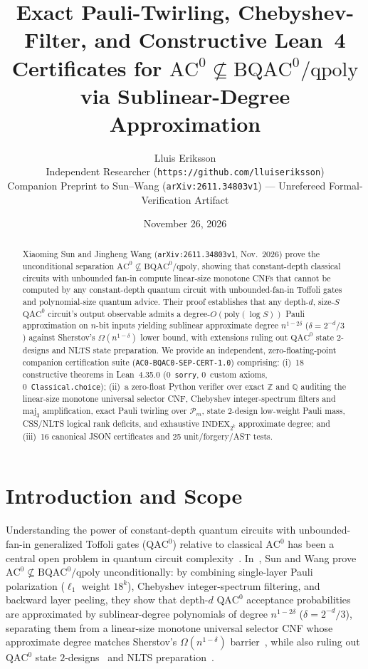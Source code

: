 \documentclass[10pt,twocolumn]{article}
\title{\vspace{-1.2em}\textbf{Exact Pauli-Twirling, Chebyshev-Filter, and Constructive Lean~4 Certificates for $\mathrm{AC}^0 \not\subseteq \mathrm{BQAC}^0/\mathrm{qpoly}$ via Sublinear-Degree Approximation}\vspace{-0.4em}}
\author{Lluis Eriksson\\
\small Independent Researcher (\nolinkurl{https://github.com/lluiseriksson})\\
\small Companion Preprint to Sun--Wang (\texttt{arXiv:2611.34803v1}) --- Unrefereed Formal-Verification Artifact\vspace{-0.6em}}
\date{November 26, 2026}
\begin{document}
\maketitle

\begin{abstract}
\noindent Xiaoming Sun and Jingheng Wang (\texttt{arXiv:2611.34803v1}, Nov.~2026) prove the unconditional separation $\mathrm{AC}^0 \not\subseteq \mathrm{BQAC}^0/\mathrm{qpoly}$, showing that constant-depth classical circuits with unbounded fan-in compute linear-size monotone CNFs that cannot be computed by any constant-depth quantum circuit with unbounded-fan-in Toffoli gates and polynomial-size quantum advice. Their proof establishes that any depth-$d$, size-$S$ $\mathrm{QAC}^0$ circuit's output observable admits a degree-$O(\mathrm{poly}(\log S))$ Pauli approximation on $n$-bit inputs yielding sublinear approximate degree $n^{1-2\delta}$ ($\delta = 2^{-d}/3$) against Sherstov's $\Omega(n^{1-\delta})$ lower bound, with extensions ruling out $\mathrm{QAC}^0$ state $2$-designs and NLTS state preparation. We provide an independent, zero-floating-point companion certification suite (\texttt{AC0-BQAC0-SEP-CERT-1.0}) comprising: (i)~18 constructive theorems in Lean~4.35.0 (0~\texttt{sorry}, 0~custom axioms, 0~\texttt{Classical.choice}); (ii)~a zero-float Python verifier over exact $\mathbb{Z}$ and $\mathbb{Q}$ auditing the linear-size monotone universal selector CNF, Chebyshev integer-spectrum filters and $\mathrm{maj}_3$ amplification, exact Pauli twirling over $\mathcal{P}_m$, state $2$-design low-weight Pauli mass, CSS/NLTS logical rank deficits, and exhaustive $\mathrm{INDEX}_{2^k}$ approximate degree; and (iii)~16 canonical JSON certificates and 25 unit/forgery/AST tests.
\end{abstract}

\section{Introduction and Scope}
Understanding the power of constant-depth quantum circuits with unbounded-fan-in generalized Toffoli gates ($\mathrm{QAC}^0$) relative to classical $\mathrm{AC}^0$ has been a central open problem in quantum circuit complexity~\cite{Rosenthal2021QAC0}. In~\cite{SunWang2026AC0BQAC0}, Sun and Wang prove $\mathrm{AC}^0 \not\subseteq \mathrm{BQAC}^0/\mathrm{qpoly}$ unconditionally: by combining single-layer Pauli polarization ($\ell_1$ weight $18^k$), Chebyshev integer-spectrum filtering, and backward layer peeling, they show that depth-$d$ $\mathrm{QAC}^0$ acceptance probabilities are approximated by sublinear-degree polynomials of degree $n^{1-2\delta}$ ($\delta = 2^{-d}/3$), separating them from a linear-size monotone universal selector CNF whose approximate degree matches Sherstov's $\Omega(n^{1-\delta})$ barrier~\cite{Sherstov2022AC0Deg}, while also ruling out $\mathrm{QAC}^0$ state $2$-designs~\cite{GrossNezamiWalter2021Stabilizer} and NLTS preparation~\cite{AnshuBreuckmannNirkhe2023NLTS}.
\end{document}
